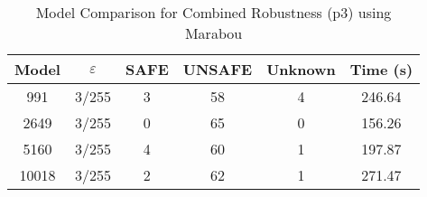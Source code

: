 \begin{table}[htbp]
\centering
\caption{Model Comparison for Combined Robustness (p3) using Marabou}
\label{tab:p3_marabou_model_comparison}
\begin{tabular}{|c|c|c|c|c|c|}
\hline
Model & $\varepsilon$ & SAFE & UNSAFE & Unknown & Time (s) \\ \hline
991 & 3/255 & 3 & 58 & 4 & 246.64 \\ \hline
2649 & 3/255 & 0 & 65 & 0 & 156.26 \\ \hline
5160 & 3/255 & 4 & 60 & 1 & 197.87 \\ \hline
10018 & 3/255 & 2 & 62 & 1 & 271.47 \\ \hline
\end{tabular}
\end{table}
